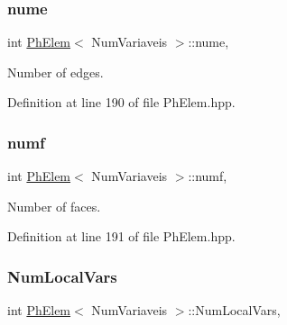 \mbox{\label{classPhElem_a1c0c7833feba84d4ed83d172244ca3e1}} 
\subsubsection{\texorpdfstring{nume}{nume}}
{\footnotesize\ttfamily int \hyperlink{classPhElem}{Ph\+Elem}$<$ Num\+Variaveis $>$\+::nume\hspace{0.3cm}{\ttfamily [protected]}, {\ttfamily [inherited]}}



Number of edges. 



Definition at line 190 of file Ph\+Elem.\+hpp.

\mbox{\label{classPhElem_a85d9a8342adf9e155a533edf165a6fe3}} 
\subsubsection{\texorpdfstring{numf}{numf}}
{\footnotesize\ttfamily int \hyperlink{classPhElem}{Ph\+Elem}$<$ Num\+Variaveis $>$\+::numf\hspace{0.3cm}{\ttfamily [protected]}, {\ttfamily [inherited]}}



Number of faces. 



Definition at line 191 of file Ph\+Elem.\+hpp.

\mbox{\label{classPhElem_a2ec71d768628a94d7fbe74be08a08ea9}} 
\subsubsection{\texorpdfstring{Num\+Local\+Vars}{NumLocalVars}}
{\footnotesize\ttfamily int \hyperlink{classPhElem}{Ph\+Elem}$<$ Num\+Variaveis $>$\+::Num\+Local\+Vars\hspace{0.3cm}{\ttfamily [protected]}, {\ttfamily [inherited]}}



